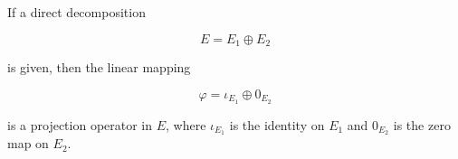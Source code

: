 If a direct decomposition

$$
E = E_1 \oplus E_2
$$

is given, then the linear mapping

$$
\varphi = \iota_{E_1} \oplus 0_{E_2}
$$

is a projection operator in $E$, where $\iota_{E_1}$ is the identity on $E_1$ and $0_{E_2}$ is the zero map on $E_2$.

